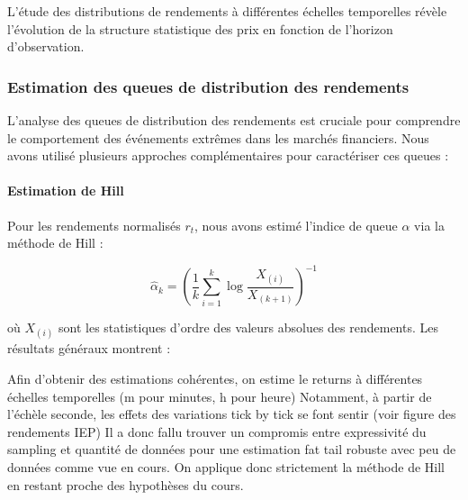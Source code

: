 \documentclass[10pt,a4paper]{article}
\theoremstyle{definition}
\theoremstyle{remark}
\begin{document}
\begin{itemize}
L'étude des distributions de rendements à différentes échelles temporelles révèle l'évolution de la structure statistique des prix en fonction de l'horizon d'observation.

\subsubsection{Estimation des queues de distribution des rendements}

L'analyse des queues de distribution des rendements est cruciale pour comprendre le comportement des événements extrêmes dans les marchés financiers. Nous avons utilisé plusieurs approches complémentaires pour caractériser ces queues :

\paragraph{Estimation de Hill}
Pour les rendements normalisés $r_t$, nous avons estimé l'indice de queue $\alpha$ via la méthode de Hill :

\begin{equation}
\hat{\alpha}_k = \left(\frac{1}{k} \sum_{i=1}^k \log \frac{X_{(i)}}{X_{(k+1)}}\right)^{-1}
\end{equation}

où $X_{(i)}$ sont les statistiques d'ordre des valeurs absolues des rendements. Les résultats généraux montrent :

Afin d'obtenir des estimations cohérentes, on estime le returns à différentes échelles temporelles (m pour minutes, h pour heure)
Notamment, à partir de l'échèle seconde, les effets des variations tick by tick se font sentir (voir figure des rendements IEP)
Il a donc fallu trouver un compromis entre expressivité du sampling et quantité de données pour une estimation fat tail robuste avec peu de données comme vue en cours.
On applique donc strictement la méthode de Hill en restant proche des hypothèses du cours.




\end{itemize}
\end{document}
